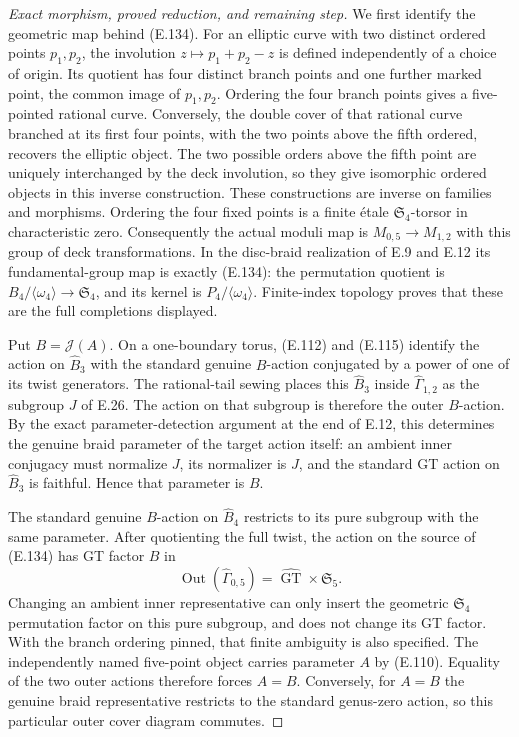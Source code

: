 \begin{proof}[Exact morphism, proved reduction, and remaining step]
We first identify the geometric map behind
(E.134).  For an elliptic curve with two
distinct ordered points $p_1,p_2$, the
involution $z\mapsto p_1+p_2-z$ is defined
independently of a choice of origin.
Its quotient has four distinct branch
points and one further marked point,
the common image of $p_1,p_2$.
Ordering the four branch points gives a
five-pointed rational curve.  Conversely,
the double cover of that rational curve
branched at its first four points, with
the two points above the fifth ordered,
recovers the elliptic object.
The two possible orders above the fifth
point are uniquely interchanged by the
deck involution, so they give isomorphic
ordered objects in this inverse
construction.
These constructions are inverse on
families and morphisms.  Ordering the
four fixed points is a finite étale
$\mathfrak S_4$-torsor in characteristic
zero.  Consequently the actual moduli
map is
$M_{0,5}\to M_{1,2}$ with this group
of deck transformations.
In the disc-braid realization of E.9
and E.12 its fundamental-group map is
exactly (E.134): the permutation
quotient is
$B_4/\langle\omega_4\rangle\to
\mathfrak S_4$, and its kernel is
$P_4/\langle\omega_4\rangle$.
Finite-index topology proves that these
are the full completions displayed.

Put $B=\mathcal J(A)$.
On a one-boundary torus, (E.112) and
(E.115) identify the action on
$\widehat B_3$ with the standard genuine
$B$-action conjugated by a power of
one of its twist generators.
The rational-tail sewing places this
$\widehat B_3$ inside
$\widehat\Gamma_{1,2}$ as the subgroup
$J$ of E.26.  The action on that
subgroup is therefore the outer
$B$-action.
By the exact parameter-detection
argument at the end of E.12, this
determines the genuine braid parameter
of the target action itself: an ambient
inner conjugacy must normalize $J$,
its normalizer is $J$, and the
standard GT action on
$\widehat B_3$ is faithful.
Hence that parameter is $B$.

The standard genuine $B$-action on
$\widehat B_4$ restricts to its pure
subgroup with the same parameter.
After quotienting the full twist,
the action on the source of
(E.134) has GT factor $B$ in
\[
 \operatorname{Out}(\widehat\Gamma_{0,5})
       =\widehat{\operatorname{GT}}\times\mathfrak S_5.
\]
Changing an ambient inner
representative can only insert
the geometric $\mathfrak S_4$
permutation factor on this pure
subgroup, and does not change
its GT factor.  With the branch
ordering pinned, that finite
ambiguity is also specified.
The independently named five-point
object carries parameter $A$
by (E.110).
Equality of the two outer actions
therefore forces $A=B$.
Conversely, for $A=B$ the genuine
braid representative restricts
to the standard genus-zero action,
so this particular outer cover
diagram commutes.


\end{proof}
